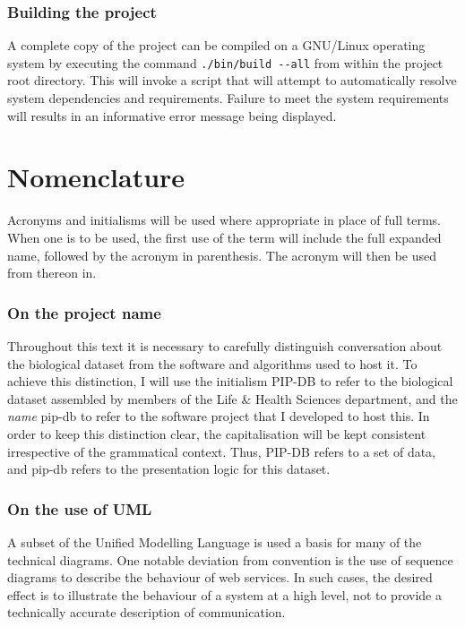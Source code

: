 \subsubsection*{Building the project}
A complete copy of the project can be compiled on a GNU/Linux
operating system by executing the command \texttt{./bin/build -{}-all}
from within the project root directory. This will invoke a script that
will attempt to automatically resolve system dependencies and
requirements. Failure to meet the system requirements will results in
an informative error message being displayed.



\newpage
\section*{Nomenclature}\label{sec:nomenclature}
Acronyms and initialisms will be used where appropriate in place of
full terms. When one is to be used, the first use of the term will
include the full expanded name, followed by the acronym in
parenthesis. The acronym will then be used from thereon in.


\subsubsection*{On the project name}
Throughout this text it is necessary to carefully distinguish
conversation about the biological dataset from the software and
algorithms used to host it. To achieve this distinction, I will use
the initialism PIP-DB to refer to the biological dataset assembled by
members of the Life \& Health Sciences department, and the
\textit{name} pip-db to refer to the software project that I developed
to host this. In order to keep this distinction clear, the
capitalisation will be kept consistent irrespective of the grammatical
context. Thus, PIP-DB refers to a set of data, and pip-db refers to
the presentation logic for this dataset.


\subsubsection*{On the use of UML}
A subset of the Unified Modelling Language \cite{ibm2003uml} is used a
basis for many of the technical diagrams. One notable deviation from
convention is the use of sequence diagrams \cite{ibm2004sequence} to
describe the behaviour of web services. In such cases, the desired
effect is to illustrate the behaviour of a system at a high level, not
to provide a technically accurate description of communication.


